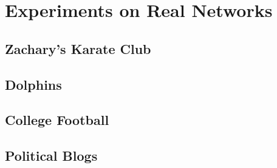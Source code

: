 \chapter{Experiments on Real Networks}


\section{Zachary's Karate Club}


\section{Dolphins}


\section{College Football}


\section{Political Blogs}